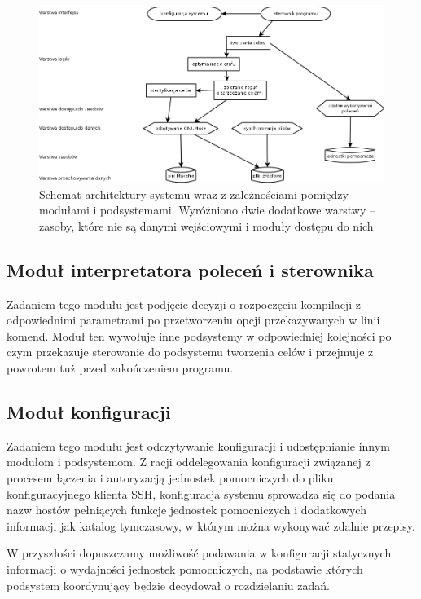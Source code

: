 \documentclass[a4paper]{article}
\begin{document}
\begin{figure}[h!t]
	\centering
	\includegraphics[width=450px]{architektura_podsystemy.png}
	\caption{Schemat architektury systemu wraz z zależnościami pomiędzy modułami i podsystemami. Wyróżniono dwie dodatkowe warstwy -- zasoby, które nie są danymi wejściowymi i moduły dostępu do nich \label{fig:arch}}
\end{figure}

\subsection{Moduł interpretatora poleceń i sterownika}

Zadaniem tego modułu jest podjęcie decyzji o rozpoczęciu kompilacji z odpowiednimi parametrami po przetworzeniu opcji przekazywanych w linii komend.
Moduł ten wywołuje inne podsystemy w odpowiedniej kolejności po czym przekazuje sterowanie do podsystemu tworzenia celów i przejmuje z powrotem tuż przed zakończeniem programu.

\subsection{Moduł konfiguracji}

Zadaniem tego modułu jest odczytywanie konfiguracji i udostępnianie innym modułom i podsystemom.
Z racji oddelegowania konfiguracji związanej z procesem łączenia i autoryzacją jednostek pomocniczych do pliku konfiguracyjnego klienta SSH, konfiguracja systemu sprowadza się do podania nazw hostów pełniących funkcje jednostek pomocniczych i dodatkowych informacji jak katalog tymczasowy, w którym można wykonywać zdalnie przepisy.

W przyszłości dopuszczamy możliwość podawania w konfiguracji statycznych informacji o wydajności jednostek pomocniczych, na podstawie których podsystem koordynujący będzie decydował o rozdzielaniu zadań.
\end{document}
